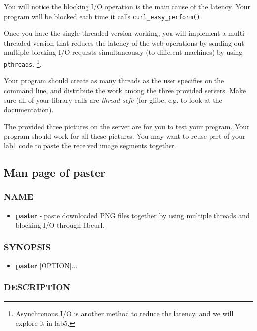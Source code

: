 You will notice the blocking I/O operation is the main cause of the latency. Your program will be blocked each time it calls \verb+curl_easy_perform()+.

Once you have the single-threaded version working, you will implement a multi-threaded version that reduces the latency of the web operations by sending out multiple blocking I/O requests simultaneously (to different machines) by using \verb+pthreads+.
\footnote{Asynchronous I/O is another method to reduce the latency, and we will explore it in lab5.}. 

Your program should create as many threads as the user specifies on the command line, and distribute the work among the three provided servers. Make sure all of your library  calls are {\em thread-safe} (for glibc, e.g.  to look at the documentation).

The provided three pictures on the server are for you to test your program. Your program should work for all these pictures. You may want to reuse part of your lab1 code to paste the received image segments together. 

\subsection{Man page of paster}
\label{sec:man_paster_par}

\subsubsection*{NAME}
\begin{itemize}
    \item[]{\bf paster} - paste downloaded PNG files together
        by using multiple threads and blocking I/O through libcurl.
\end{itemize}

\subsubsection*{SYNOPSIS}

\begin{itemize}
\item []{\bf paster} [OPTION]...
\end{itemize}

\subsubsection*{DESCRIPTION}

